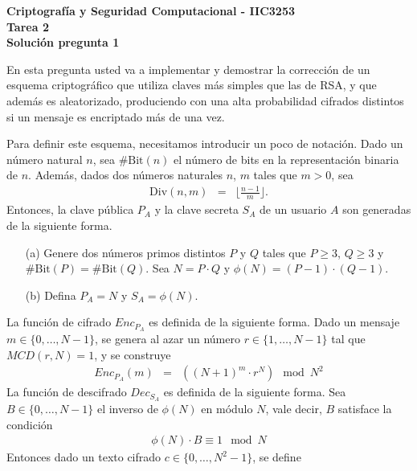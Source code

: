 \documentclass[11pt]{article}
\newcommand{\Enc}{\textit{Enc}}
\newcommand{\Dec}{\textit{Dec}}
\newcommand{\MCD}{\textit{MCD}}
\begin{document}
\begin{center}
  \bf Criptografía y Seguridad Computacional - IIC3253\\
  \bf Tarea 2\\
  \bf Solución pregunta 1
\end{center}

\bigskip

\noindent

\newcommand{\bbit}{\#\text{Bit}}
\newcommand{\dv}{\text{Div}}

En esta pregunta usted va a implementar y demostrar la corrección de un
esquema criptográfico que utiliza claves más simples que las de RSA, y
que además es aleatorizado, produciendo con una alta probabilidad cifrados distintos si un
mensaje es encriptado más de una vez.

Para definir este esquema, necesitamos introducir un poco de
notación. Dado un número natural $n$, sea $\#\text{Bit}(n)$ el número
de bits en la representación binaria de $n$. Además, dados dos números
naturales $n$, $m$ tales que $m > 0$, sea
  \begin{eqnarray*}
\dv(n,m) &=& \bigg\lfloor \frac{n-1}{m} \bigg\rfloor.
  \end{eqnarray*}
Entonces, la clave pública $P_A$ y la clave
secreta $S_A$ de un usuario $A$ son generadas de la siguiente forma.
\begin{enumerate}
\item[(a)] Genere dos números primos distintos $P$ y $Q$ tales que $P \geq
  3$, $Q \geq 3$ y $\bbit(P) = \bbit(Q)$.  Sea $N = P \cdot Q$ y
  $\phi(N) = (P-1) \cdot (Q-1)$.

\item[(b)] Defina $P_A = N$ y $S_A = \phi(N)$.
\end{enumerate}
La función de cifrado $\Enc_{P_A}$ es definida de la siguiente
forma. Dado un mensaje $m \in \{0, \ldots, N-1\}$, se genera al azar un número $r
\in \{1, \ldots, N-1\}$ tal que $\MCD(r, N) = 1$, y se construye
  \begin{eqnarray*}
    \Enc_{P_A}(m) &=& ((N+1)^m \cdot r^N) \!\! \mod N^2
  \end{eqnarray*}
La función de descifrado $\Dec_{S_A}$ es definida de la siguiente
forma. Sea $B \in \{0, \ldots, N-1\}$ el inverso de $\phi(N)$ en módulo
$N$, vale decir, $B$ satisface la condición
\begin{eqnarray*}
  \phi(N) \cdot B \equiv 1  \mod N
\end{eqnarray*}
Entonces dado un texto cifrado $c \in \{0, \ldots, N^2-1\}$, se define 
\end{document}
